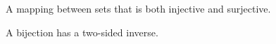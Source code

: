 A mapping between sets that is both injective and
surjective. 
\par
A  bijection has a two-sided inverse.


